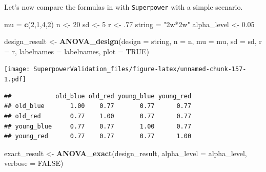 \documentclass[]{book}
\newenvironment{Shaded}{\begin{snugshade}}{\end{snugshade}}
\newcommand{\DataTypeTok}[1]{\textcolor[rgb]{0.13,0.29,0.53}{#1}}
\newcommand{\DecValTok}[1]{\textcolor[rgb]{0.00,0.00,0.81}{#1}}
\newcommand{\FloatTok}[1]{\textcolor[rgb]{0.00,0.00,0.81}{#1}}
\newcommand{\KeywordTok}[1]{\textcolor[rgb]{0.13,0.29,0.53}{\textbf{#1}}}
\newcommand{\NormalTok}[1]{#1}
\newcommand{\OperatorTok}[1]{\textcolor[rgb]{0.81,0.36,0.00}{\textbf{#1}}}
\newcommand{\OtherTok}[1]{\textcolor[rgb]{0.56,0.35,0.01}{#1}}
\newcommand{\StringTok}[1]{\textcolor[rgb]{0.31,0.60,0.02}{#1}}
\begin{document}
Let's now compare the formulas in \citet{potvin2000statistical} with \texttt{Superpower} with a simple scenario.

\begin{Shaded}
\begin{Highlighting}[]
\NormalTok{mu =}\StringTok{ }\KeywordTok{c}\NormalTok{(}\DecValTok{2}\NormalTok{,}\DecValTok{1}\NormalTok{,}\DecValTok{4}\NormalTok{,}\DecValTok{2}\NormalTok{) }
\NormalTok{n <-}\StringTok{ }\DecValTok{20}
\NormalTok{sd <-}\StringTok{ }\DecValTok{5}
\NormalTok{r <-}\StringTok{ }\FloatTok{.77}
\NormalTok{string =}\StringTok{ "2w*2w"}
\NormalTok{alpha_level <-}\StringTok{ }\FloatTok{0.05}


\NormalTok{design_result <-}\StringTok{ }\KeywordTok{ANOVA_design}\NormalTok{(}\DataTypeTok{design =}\NormalTok{ string,}
                              \DataTypeTok{n =}\NormalTok{ n, }
                              \DataTypeTok{mu =}\NormalTok{ mu, }
                              \DataTypeTok{sd =}\NormalTok{ sd, }
                              \DataTypeTok{r =}\NormalTok{ r, }
                              \DataTypeTok{labelnames =}\NormalTok{ labelnames,}
                              \DataTypeTok{plot =} \OtherTok{TRUE}\NormalTok{)}
\end{Highlighting}
\end{Shaded}

\texttt{[image: SuperpowerValidation\_files/figure-latex/unnamed-chunk-157-1.pdf]}

\begin{Shaded}
\end{Shaded}

\begin{verbatim}
##            old_blue old_red young_blue young_red
## old_blue       1.00    0.77       0.77      0.77
## old_red        0.77    1.00       0.77      0.77
## young_blue     0.77    0.77       1.00      0.77
## young_red      0.77    0.77       0.77      1.00
\end{verbatim}

\begin{Shaded}
\begin{Highlighting}[]
\NormalTok{exact_result <-}\StringTok{ }\KeywordTok{ANOVA_exact}\NormalTok{(design_result,}
                            \DataTypeTok{alpha_level =}\NormalTok{ alpha_level,}
                            \DataTypeTok{verbose =} \OtherTok{FALSE}\NormalTok{)}
\end{Highlighting}
\end{Shaded}
\end{document}
